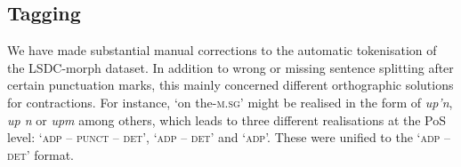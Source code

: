 \documentclass[output=paper,colorlinks,citecolor=brown]{langscibook}
\begin{document}
\subsection{Tagging}\label{section:tagging}





We have made substantial manual corrections to the automatic tokenisation of the LSDC-morph dataset. In addition to wrong or missing sentence splitting after certain punctuation marks, this mainly concerned different orthographic solutions for contractions. For instance, `on the-\textsc{m.sg}' might be realised in the form of \textit{up'n}, \textit{up n} or \textit{upm} among others, which leads to three different realisations at the PoS level: `\textsc{adp} -- \textsc{punct} -- \textsc{det}', `\textsc{adp} -- \textsc{det}' and `\textsc{adp}'. These were unified to the `\textsc{adp} -- \textsc{det}' format. 
\end{document}
